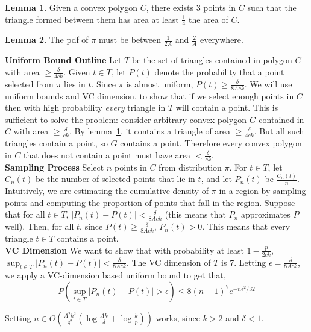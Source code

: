 \documentclass[12pt]{article}
\theoremstyle{definition}
\theoremstyle{lemma}
\newtheorem{lemma}{Lemma}[section]
\theoremstyle{theorem}
\begin{document}
\begin{lemma}
Given a convex polygon $C$, there exists 3 points in $C$ such that the triangle formed between them has area at least $\frac{1}{4}$ the area of $C$.
\label{lemma:convex_approx}
\end{lemma}

\begin{lemma}
The pdf of $\pi$ must be between $\frac{1}{2A}$ and $\frac{2}{A}$ everywhere.
\end{lemma}

\textbf{Uniform Bound Outline} Let $T$ be the set of triangles contained in polygon $C$ with area $\geq \frac{\delta}{4ck}$.  Given $t \in T$, let $P(t)$ denote the probability that a point selected from $\pi$ lies in $t$. Since $\pi$ is almost uniform, $P(t) \geq \frac{\delta}{8Ack}$. We will use uniform bounds and VC dimension, to show that if we select enough points in $C$ then with high probability \emph{every} triangle in $T$ will contain a point. This is sufficient to solve the problem: consider arbitrary convex polygon $G$ contained in $C$ with area $\geq \frac{\delta}{ck}$. By lemma~\ref{lemma:convex_approx}, it contains a triangle of area $\geq \frac{\delta}{4ck}$. But all such triangles contain a point, so $G$ contains a point. Therefore every convex polygon in $C$ that does not contain a point must have area $< \frac{\delta}{ck}$.
\\

\textbf{Sampling Process} Select $n$ points in $C$ from distribution $\pi$. For $t \in T$, let $C_n(t)$ be the number of selected points that lie in $t$, and let $P_n(t)$ be $\frac{C_n(t)}{n}$. Intuitively, we are estimating the cumulative density of $\pi$ in a region by sampling points and computing the proportion of points that fall in the region. Suppose that for all $t \in T$, $|P_n(t) - P(t)| < \frac{\delta}{8Ack}$ (this means that $P_n$ approximates $P$ well). Then, for all $t$, since $P(t) \geq \frac{\delta}{8Ack}$, $P_n(t) > 0$. This means that every triangle $t \in T$ contains a point.
\\

\textbf{VC Dimension} We want to show that with probability at least $1-\frac{p}{2ck}$, $\sup_{t \in T} |P_n(t) - P(t)| < \frac{\delta}{8Ack}$. The VC dimension of $T$ is 7. Letting $\epsilon = \frac{\delta}{8Ack}$, we apply a VC-dimension based uniform bound to get that,
\[ P(\sup_{t \in T} |P_n(t) - P(t)| > \epsilon) \leq 8(n+1)^7 e^{-n\epsilon^2/32} \]

Setting $n  \in O(\frac{A^2k^2}{\delta^2} (\log{\frac{Ak}{\delta}} + \log{\frac{k}{p}}))$ works, since $k > 2$ and $\delta < 1$.
\\
\end{document}
